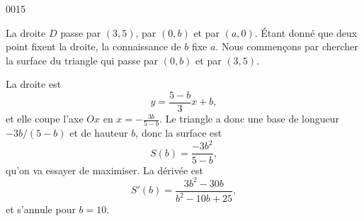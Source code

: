 \begin{corrige}{0015}

La droite $D$ passe par $(3,5)$, par $(0,b)$ et par $(a,0)$. Étant donné que deux point fixent la droite, la connaissance de $b$ fixe $a$. Nous commençons par chercher la surface du triangle qui passe par $(0,b)$ et par $(3,5)$.

La droite est
\begin{equation}
	y=\frac{ 5-b }{ 3 }x+b,
\end{equation}
et elle coupe l'axe $Ox$ en $x=-\frac{ 3b }{ 5-b }$. Le triangle a donc une base de longueur $-3b/(5-b)$ et de hauteur $b$, donc la surface est
\begin{equation}
	S(b)=\frac{ -3b^2 }{ 5-b },
\end{equation}
qu'on va essayer de maximiser. La dérivée est
\begin{equation}
	S'(b)=\frac{ 3b^2-30b }{ b^2-10b+25 },
\end{equation}
et s'annule pour $b=10$.

\end{corrige}
